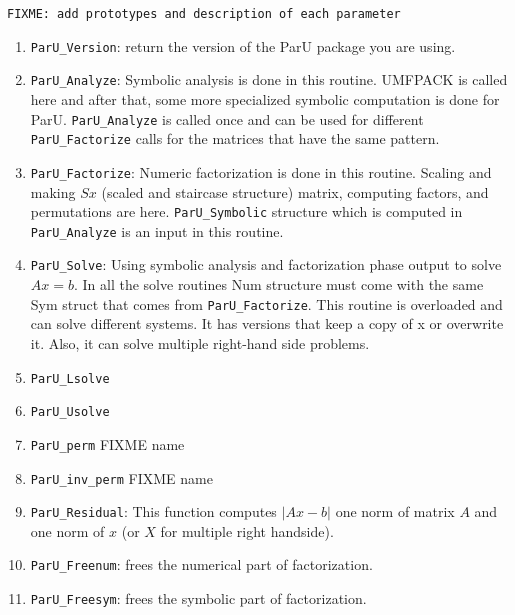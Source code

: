 \documentclass[12pt]{article}
\begin{document}
\verb'FIXME: add prototypes and description of each parameter' %

\begin{enumerate}

    \item \verb'ParU_Version': return the version of the ParU package 
        you are using.

    \item \verb'ParU_Analyze': Symbolic analysis is done in this routine. 
        UMFPACK is called here and after that, some more specialized symbolic
        computation is done for ParU. 
        \verb'ParU_Analyze' is called once and can be used for different 
        \verb'ParU_Factorize' calls for the matrices that have the same pattern.
    \item \verb'ParU_Factorize': 
        Numeric factorization is done in this routine. Scaling and
        making $Sx$ (scaled and staircase structure) matrix, computing factors,
        and permutations are here. \verb'ParU_Symbolic' structure which is 
        computed in \verb'ParU_Analyze' is an input in this routine.

    \item \verb'ParU_Solve':  
        Using symbolic analysis and factorization phase output to solve $Ax=b$.
        In all the solve routines Num structure must come with the same 
        Sym struct that comes from \verb'ParU_Factorize'. 
        This routine is overloaded and can solve different systems. It has 
        versions that keep a copy of x or overwrite it. Also, it can solve 
        multiple right-hand side problems.

    \item \verb'ParU_Lsolve'
    \item \verb'ParU_Usolve'
    \item \verb'ParU_perm' FIXME name
    \item \verb'ParU_inv_perm' FIXME name

    \item \verb'ParU_Residual':  
        This function computes $|Ax-b|$ one norm of matrix $A$ and one norm of
        $x$ (or $X$ for multiple right handside).

    \item \verb'ParU_Freenum':  frees the numerical part of factorization.

    \item \verb'ParU_Freesym':  frees the symbolic part of factorization.

\end{enumerate}
\end{document}

